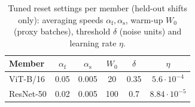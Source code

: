 \begin{table}[t]
  \centering\small
  \caption{Tuned reset settings per member (held-out shifts only): averaging speeds $\alpha_{\mathrm f}, \alpha_{\mathrm s}$, warm-up $W_0$ (proxy batches), threshold $\delta$ (noise units) and learning rate $\eta$.}
  \label{tab:reset_settings}
  \begin{tabular}{@{}lccccc@{}}
    \toprule
    Member & $\alpha_{\mathrm f}$ & $\alpha_{\mathrm s}$ & $W_0$ & $\delta$ & $\eta$ \\
    \midrule
    ViT-B/16 & 0.05 & 0.005 & 20 & 0.35 & $5.6 \cdot 10^{-4}$ \\
    ResNet-50 & 0.02 & 0.005 & 100 & 0.7 & $8.84 \cdot 10^{-5}$ \\
    \bottomrule
  \end{tabular}
\end{table}
